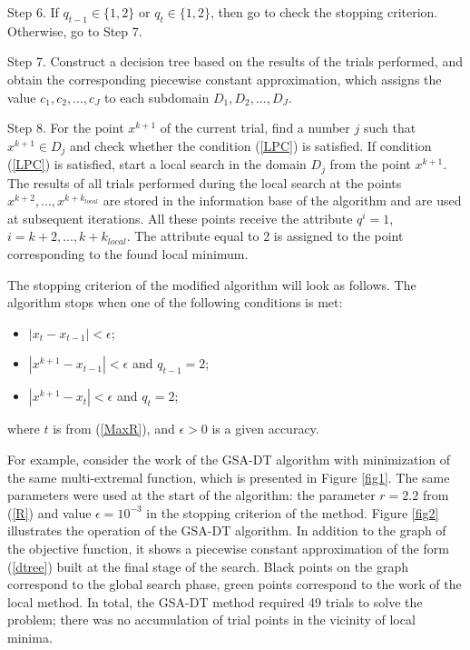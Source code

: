 \documentclass[entropy,article,submit,moreauthors,pdftex]{Definitions/mdpi}
\begin{document}
Step 6. If $q_{t-1} \in \{1,2\}$ or $q_t \in \{1,2\}$, then go to check the stopping criterion. Otherwise, go to Step 7.

Step 7. Construct a decision tree based on the results of the trials performed, and obtain the corresponding piecewise constant approximation, which assigns the value $c_1, c_2, ..., c_J$ to each subdomain  $D_1, D_2, ..., D_J$.

Step 8. For the point $x^{k+1}$ of the current trial, find a number $j$ such that $x^{k+1} \in D_j$ and check whether the condition  (\ref{LPC}) is satisfied. If condition (\ref{LPC}) is satisfied, start a local search in the domain $D_j$ from the point  $x^{k+1}$. 
The results of all trials performed during the local search at the points $x^{k+2}, ...,x^{k+k_{local}}$ are stored in the information base of the algorithm and are used at subsequent iterations. 
All these points receive the attribute  $q^i=1$, $i = k+2, ... , k+k_{local}$. The attribute equal to 2 is assigned to the point corresponding to the found local minimum.

The stopping criterion of the modified algorithm will look as follows. 
The algorithm stops when one of the following conditions is met:

\begin{itemize}
	\item $|x_{t} - x_{t-1}|<\epsilon$;
	\item $|x^{k+1} - x_{t-1}|<\epsilon$ and $q_{t-1} = 2$;
	\item $|x^{k+1}-x_{t}|<\epsilon$ and $q_{t} = 2$;
\end{itemize}
where $t$ is from (\ref{MaxR}), and $\epsilon>0$ is a given accuracy.

For example, consider the work of the GSA-DT algorithm with minimization of the same multi-extremal function, which is presented in Figure \ref{fig1}. The same parameters were used at the start of the algorithm: the parameter  $r=2.2$ from (\ref{R}) and value $\epsilon = 10^{-3}$ in the stopping criterion of the method. 
Figure \ref{fig2} illustrates the operation of the GSA-DT algorithm. In addition to the graph of the objective function, it shows a piecewise constant approximation of the form (\ref{dtree}) built at the final stage of the search. Black points on the graph correspond to the global search phase, green points correspond to the work of the local method. In total, the GSA-DT method required 49 trials to solve the problem; there was no accumulation of trial points in the vicinity of local minima.
 
\end{document}
